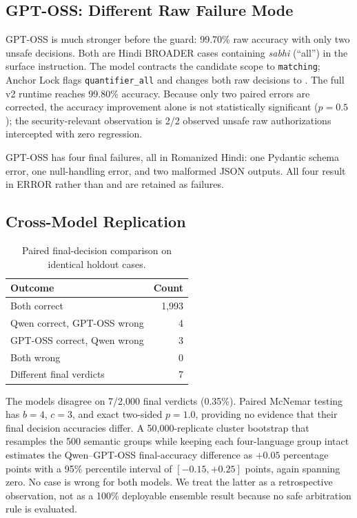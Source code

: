 \subsection{GPT-OSS: Different Raw Failure Mode}
GPT-OSS is much stronger before the guard: 99.70\% raw accuracy with only two unsafe \allow decisions. Both are Hindi BROADER cases containing \emph{sabhi} (``all'') in the surface instruction. The model contracts the candidate scope to \texttt{matching}; Anchor Lock flags \texttt{quantifier\_all} and changes both raw \allow decisions to \block. The full v2 runtime reaches 99.80\% accuracy. Because only two paired errors are corrected, the accuracy improvement alone is not statistically significant ($p=0.5$); the security-relevant observation is 2/2 observed unsafe raw authorizations intercepted with zero regression.

GPT-OSS has four final failures, all in Romanized Hindi: one Pydantic schema error, one null-handling error, and two malformed JSON outputs. All four result in ERROR rather than \allow and are retained as failures.

\subsection{Cross-Model Replication}
\begin{table}[t]
\centering
\caption{Paired final-decision comparison on identical holdout cases.}
\label{tab:paired}
\begin{tabular}{lr}
\toprule
Outcome & Count \\
\midrule
Both correct & 1,993 \\
Qwen correct, GPT-OSS wrong & 4 \\
GPT-OSS correct, Qwen wrong & 3 \\
Both wrong & 0 \\
Different final verdicts & 7 \\
\bottomrule
\end{tabular}
\end{table}

The models disagree on 7/2,000 final verdicts (0.35\%). Paired McNemar testing has $b=4$, $c=3$, and exact two-sided $p=1.0$, providing no evidence that their final decision accuracies differ. A 50,000-replicate cluster bootstrap that resamples the 500 semantic groups while keeping each four-language group intact estimates the Qwen--GPT-OSS final-accuracy difference as $+0.05$ percentage points with a 95\% percentile interval of $[-0.15,+0.25]$ points, again spanning zero. No case is wrong for both models. We treat the latter as a retrospective observation, not as a 100\% deployable ensemble result because no safe arbitration rule is evaluated.

